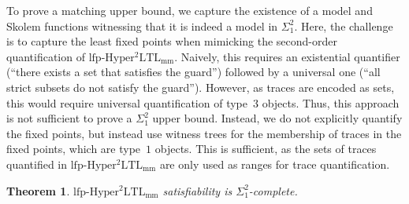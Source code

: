 \documentclass[dvipsnames,10pt,a4paper]{amsart}
\newtheorem{thm}{Theorem}[section]
\theoremstyle{definition}
\theoremstyle{remark}
\newcommand{\lfpsohyltlfp}{\mathrm{lfp\text{-}{Hyper^2LTL_{\mathrm{mm}}}}\xspace}
\newcommand{\myquot}[1]{``#1''}
\begin{document}
To prove a matching upper bound, we capture the existence of a model and Skolem functions witnessing that it is indeed a model in $\Sigma_1^2$.
Here, the challenge is to capture the least fixed points when mimicking the second-order quantification of $\lfpsohyltlfp$. Naively, this requires an existential quantifier (\myquot{there exists a set that satisfies the guard}) followed by a universal one (\myquot{all strict subsets do not satisfy the guard}).
However, as traces are encoded as sets, this would require universal quantification of type~$3$ objects.
Thus, this approach is not sufficient to prove a $\Sigma_1^2$ upper bound.
Instead, we do not explicitly quantify the fixed points, but instead use witness trees for the membership of traces in the fixed points, which are type~$1$ objects.
This is sufficient, as the sets of traces quantified in $\lfpsohyltlfp$ are only used as ranges for trace quantification.


\begin{thm}
\label{thm_satcomplexity_lfp_ss}
$\lfpsohyltlfp$ satisfiability is $\Sigma^2_1$-complete.
\end{thm}
\end{document}
